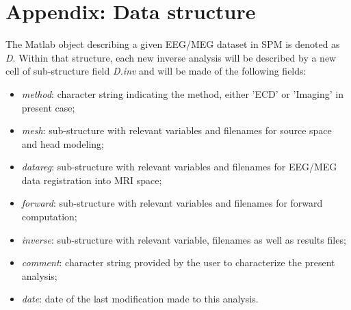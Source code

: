 \section{Appendix: Data structure}
The Matlab object describing a given EEG/MEG dataset in SPM is denoted as \textit{D}. 
Within that structure, each new inverse analysis will be described by a new cell of sub-structure 
field \textit{D.inv} and will be made of the following fields:

\begin{itemize}
    \item \textit{method}: character string indicating the method, either 'ECD' or 'Imaging' in present case;
    \item \textit{mesh}: sub-structure with relevant variables and filenames for source space and head modeling;
    \item \textit{datareg}: sub-structure with relevant variables and filenames for EEG/MEG data registration into MRI space;
    \item \textit{forward}: sub-structure with relevant variables and filenames for forward computation;
    \item \textit{inverse}: sub-structure with relevant variable, filenames as well as results files;
    \item \textit{comment}: character string provided by the user to characterize the present analysis;
    \item \textit{date}: date of the last modification made to this analysis.
\end{itemize}

